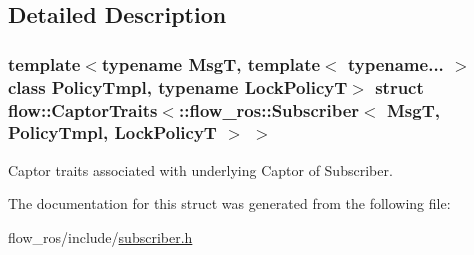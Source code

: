 \subsection{Detailed Description}
\subsubsection*{template$<$typename MsgT, template$<$ typename... $>$ class Policy\+Tmpl, typename Lock\+PolicyT$>$\newline
struct flow\+::\+Captor\+Traits$<$\+::flow\+\_\+ros\+::\+Subscriber$<$ Msg\+T, Policy\+Tmpl, Lock\+Policy\+T $>$ $>$}

Captor traits associated with underlying Captor of Subscriber. 

The documentation for this struct was generated from the following file\+:\begin{DoxyCompactItemize}
\item 
flow\+\_\+ros/include/\hyperlink{subscriber_8h}{subscriber.\+h}\end{DoxyCompactItemize}
